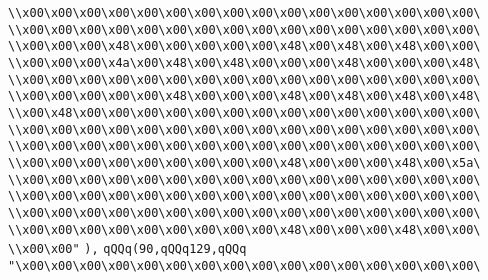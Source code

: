 \verb|\\x00\x00\x00\x00\x00\x00\x00\x00\x00\x00\x00\x00\x00\x00\x00\x00\|\newline
\verb|\\x00\x00\x00\x00\x00\x00\x00\x00\x00\x00\x00\x00\x00\x00\x00\x00\|\newline
\verb|\\x00\x00\x00\x48\x00\x00\x00\x00\x00\x48\x00\x48\x00\x48\x00\x00\|\newline
\verb|\\x00\x00\x00\x4a\x00\x48\x00\x48\x00\x00\x00\x48\x00\x00\x00\x48\|\newline
\verb|\\x00\x00\x00\x00\x00\x00\x00\x00\x00\x00\x00\x00\x00\x00\x00\x00\|\newline
\verb|\\x00\x00\x00\x00\x00\x48\x00\x00\x00\x48\x00\x48\x00\x48\x00\x48\|\newline
\verb|\\x00\x48\x00\x00\x00\x00\x00\x00\x00\x00\x00\x00\x00\x00\x00\x00\|\newline
\verb|\\x00\x00\x00\x00\x00\x00\x00\x00\x00\x00\x00\x00\x00\x00\x00\x00\|\newline
\verb|\\x00\x00\x00\x00\x00\x00\x00\x00\x00\x00\x00\x00\x00\x00\x00\x00\|\newline
\verb|\\x00\x00\x00\x00\x00\x00\x00\x00\x00\x48\x00\x00\x00\x48\x00\x5a\|\newline
\verb|\\x00\x00\x00\x00\x00\x00\x00\x00\x00\x00\x00\x00\x00\x00\x00\x00\|\newline
\verb|\\x00\x00\x00\x00\x00\x00\x00\x00\x00\x00\x00\x00\x00\x00\x00\x00\|\newline
\verb|\\x00\x00\x00\x00\x00\x00\x00\x00\x00\x00\x00\x00\x00\x00\x00\x00\|\newline
\verb|\\x00\x00\x00\x00\x00\x00\x00\x00\x00\x48\x00\x00\x00\x48\x00\x00\|\newline
\verb|\\x00\x00"|\newline
\verb|),|\newline
\verb|qQQq(90,qQQq129,qQQq|\newline
\verb|"\x00\x00\x00\x00\x00\x00\x00\x00\x00\x00\x00\x00\x00\x00\x00\x00\|\newline

